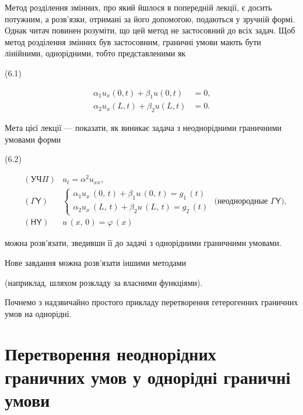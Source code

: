 \documentclass[
  ukrainian,
]{article}
\begin{document}
Метод розділення змінних, про який йшлося в попередній лекції, є досить
потужним, а розв'язки, отримані за його допомогою, подаються у зручній
формі. Однак читач повинен розуміти, що цей метод не застосовний до всіх
задач. Щоб метод розділення змінних був застосовним, граничні умови
мають бути лінійними, однорідними, тобто представленими як

(6.1)

\[
\begin{aligned} \alpha_1 u_x(0, t) + \beta_1 u(0, t) &= 0, \\ \alpha_2 u_x(L, t) + \beta_2 u(L, t) &= 0. \end{aligned}
\]

Мета цієї лекції --- показати, як виникає задача з неоднорідними
граничними умовами форми

(6.2)

\[
\begin{aligned} & (\mathsf{У}\mathsf{Ч}\Pi) & u_t = \alpha^2 u_{xx}, \\ & (\mathsf{\Gamma}\mathsf{Y}) & \begin{cases} \alpha_1 u_x \, (0, \, t) + \beta_1 u \, (0, \, t) = g_1 \, (t) \\ \alpha_2 u_x \, (L, \, t) + \beta_2 u \, (L, \, t) = g_2 \, (t) \end{cases} \text{ (неоднородные } \mathsf{\Gamma}\mathsf{Y}), \\ & (\mathsf{H}\mathsf{Y}) & u \, (x, \, 0) = \varphi \, (x) \end{aligned}
\]

можна розв'язати, зведивши її до задачі з однорідними граничними
умовами.

Нове завдання можна розв'язати іншими методами

(наприклад, шляхом розкладу за власними функціями).

Почнемо з надзвичайно простого прикладу перетворення гетерогенних
граничних умов на однорідні.

\section{Перетворення неоднорідних граничних умов у однорідні граничні
умови}\label{ux43fux435ux440ux435ux442ux432ux43eux440ux435ux43dux43dux44f-ux43dux435ux43eux434ux43dux43eux440ux456ux434ux43dux438ux445-ux433ux440ux430ux43dux438ux447ux43dux438ux445-ux443ux43cux43eux432-ux443-ux43eux434ux43dux43eux440ux456ux434ux43dux456-ux433ux440ux430ux43dux438ux447ux43dux456-ux443ux43cux43eux432ux438-1}
\end{document}
